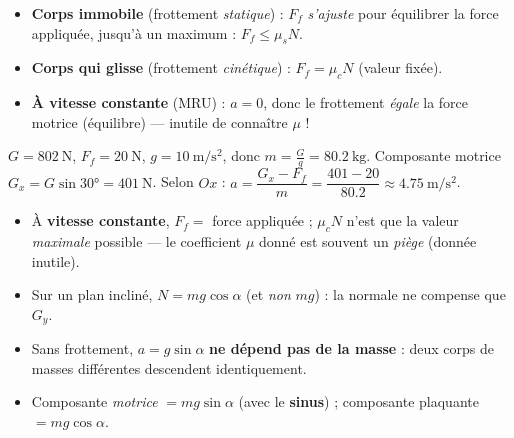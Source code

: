 \documentclass[11pt,a4paper]{article}
\begin{document}
\begin{methode}
\begin{itemize}[leftmargin=1.5em,topsep=2pt,itemsep=1.5pt]
  \item \textbf{Corps immobile} (frottement \emph{statique}) : $F_f$ \emph{s'ajuste} pour équilibrer la
        force appliquée, jusqu'à un maximum : $F_f\le \mu_s N$.
  \item \textbf{Corps qui glisse} (frottement \emph{cinétique}) : $F_f=\mu_c N$ (valeur fixée).
  \item \textbf{À vitesse constante} (MRU) : $a=0$, donc le frottement \emph{égale} la force motrice
        (équilibre) — inutile de connaître $\mu$ !
\end{itemize}
\end{methode}

\begin{exemplebox}
$G=\qty{802}{\newton}$, $F_f=\qty{20}{\newton}$, $g=\qty{10}{\metre\per\second\squared}$, donc
$m=\tfrac{G}{g}=\qty{80,2}{\kilogram}$. Composante motrice $G_x=G\sin\ang{30}=\qty{401}{\newton}$.
Selon $Ox$ : $a=\dfrac{G_x-F_f}{m}=\dfrac{401-20}{\num{80,2}}\approx\qty{4,75}{\metre\per\second\squared}$.
\end{exemplebox}

\begin{piege}
\begin{itemize}[leftmargin=1.4em,topsep=2pt,itemsep=1.5pt]
  \item À \textbf{vitesse constante}, $F_f=$ force appliquée ; $\mu_c N$ n'est que la valeur \emph{maximale}
        possible — le coefficient $\mu$ donné est souvent un \emph{piège} (donnée inutile).
  \item Sur un plan incliné, $N=mg\cos\alpha$ (et \emph{non} $mg$) : la normale ne compense que $G_y$.
  \item Sans frottement, $a=g\sin\alpha$ \textbf{ne dépend pas de la masse} : deux corps de masses
        différentes descendent identiquement.
  \item Composante \emph{motrice} $=mg\sin\alpha$ (avec le \textbf{sinus}) ; composante plaquante $=mg\cos\alpha$.
\end{itemize}
\end{piege}
\end{document}
